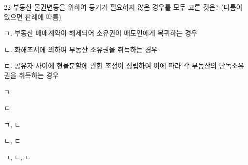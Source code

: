 \begin{question}{22}
부동산 물권변동을 위하여 등기가 필요하지 않은 경우를 모두 고른 것은? (다툼이 있으면 판례에 따름)
\begin{framedtext}
ㄱ. 부동산 매매계약이 해제되어 소유권이 매도인에게 복귀하는 경우 \par
ㄴ. 화해조서에 의하여 부동산 소유권을 취득하는 경우 \par
ㄷ. 공유자 사이에 현물분할에 관한 조정이 성립하여 이에 따라 각 부동산의 단독소유권을 취득하는 경우
\end{framedtext}
\begin{choices}
  \item ㄱ
  \item ㄷ
  \item ㄱ, ㄴ
  \item ㄴ, ㄷ
  \item ㄱ, ㄴ, ㄷ
\end{choices}
\end{question}
